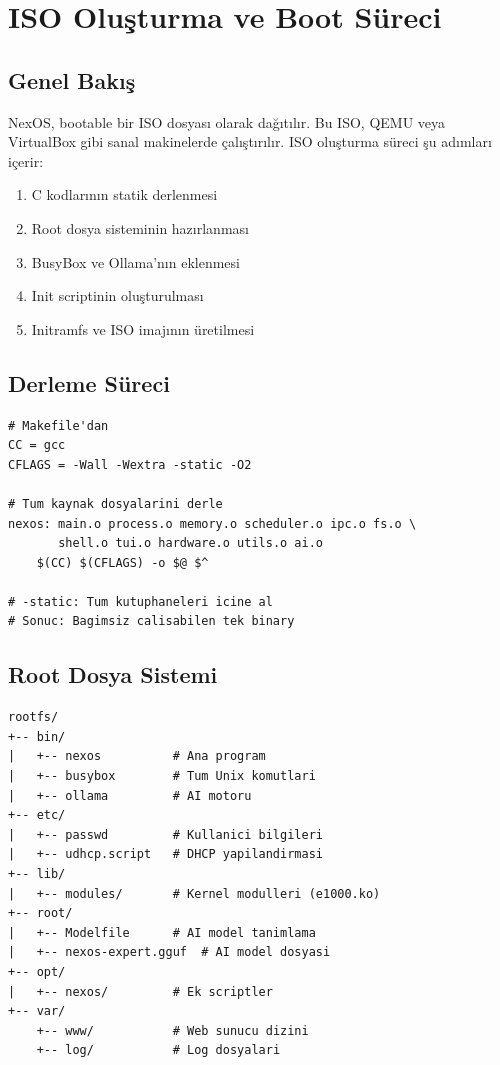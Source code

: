\documentclass[12pt,a4paper]{report}
\begin{document}
\chapter{ISO Oluşturma ve Boot Süreci}

\section{Genel Bakış}

NexOS, bootable bir ISO dosyası olarak dağıtılır. Bu ISO, QEMU veya VirtualBox gibi sanal makinelerde çalıştırılır. ISO oluşturma süreci şu adımları içerir:

\begin{enumerate}
    \item C kodlarının statik derlenmesi
    \item Root dosya sisteminin hazırlanması
    \item BusyBox ve Ollama'nın eklenmesi
    \item Init scriptinin oluşturulması
    \item Initramfs ve ISO imajının üretilmesi
\end{enumerate}

\section{Derleme Süreci}

\begin{lstlisting}[style=bashstyle,caption={Statik Derleme}]
# Makefile'dan
CC = gcc
CFLAGS = -Wall -Wextra -static -O2

# Tum kaynak dosyalarini derle
nexos: main.o process.o memory.o scheduler.o ipc.o fs.o \
       shell.o tui.o hardware.o utils.o ai.o
    $(CC) $(CFLAGS) -o $@ $^

# -static: Tum kutuphaneleri icine al
# Sonuc: Bagimsiz calisabilen tek binary
\end{lstlisting}

\section{Root Dosya Sistemi}
\begin{lstlisting}[style=bashstyle,caption={RootFS Yapisi}]
rootfs/
+-- bin/
|   +-- nexos          # Ana program
|   +-- busybox        # Tum Unix komutlari
|   +-- ollama         # AI motoru
+-- etc/
|   +-- passwd         # Kullanici bilgileri
|   +-- udhcp.script   # DHCP yapilandirmasi
+-- lib/
|   +-- modules/       # Kernel modulleri (e1000.ko)
+-- root/
|   +-- Modelfile      # AI model tanimlama
|   +-- nexos-expert.gguf  # AI model dosyasi
+-- opt/
|   +-- nexos/         # Ek scriptler
+-- var/
    +-- www/           # Web sunucu dizini
    +-- log/           # Log dosyalari
\end{lstlisting}
\end{document}
